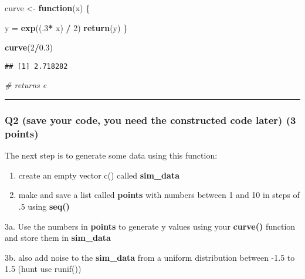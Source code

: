 \documentclass[]{article}
\newenvironment{Shaded}{\begin{snugshade}}{\end{snugshade}}
\newcommand{\KeywordTok}[1]{\textcolor[rgb]{0.13,0.29,0.53}{\textbf{#1}}}
\newcommand{\DecValTok}[1]{\textcolor[rgb]{0.00,0.00,0.81}{#1}}
\newcommand{\FloatTok}[1]{\textcolor[rgb]{0.00,0.00,0.81}{#1}}
\newcommand{\StringTok}[1]{\textcolor[rgb]{0.31,0.60,0.02}{#1}}
\newcommand{\CommentTok}[1]{\textcolor[rgb]{0.56,0.35,0.01}{\textit{#1}}}
\newcommand{\ControlFlowTok}[1]{\textcolor[rgb]{0.13,0.29,0.53}{\textbf{#1}}}
\newcommand{\OperatorTok}[1]{\textcolor[rgb]{0.81,0.36,0.00}{\textbf{#1}}}
\newcommand{\NormalTok}[1]{#1}
\begin{document}
\begin{Shaded}
\begin{Highlighting}[]
\NormalTok{curve <-}\StringTok{ }\ControlFlowTok{function}\NormalTok{(x) \{}
  
\NormalTok{  y =}\StringTok{ }\KeywordTok{exp}\NormalTok{((.}\DecValTok{3}\OperatorTok{*}\StringTok{ }\NormalTok{x) }\OperatorTok{/}\StringTok{ }\DecValTok{2}\NormalTok{)}
  \KeywordTok{return}\NormalTok{(y)}
\NormalTok{\}}

\KeywordTok{curve}\NormalTok{(}\DecValTok{2}\OperatorTok{/}\FloatTok{0.3}\NormalTok{)}
\end{Highlighting}
\end{Shaded}

\begin{verbatim}
## [1] 2.718282
\end{verbatim}

\begin{Shaded}
\begin{Highlighting}[]
\CommentTok{# returns e}
\end{Highlighting}
\end{Shaded}

\begin{center}\rule{0.5\linewidth}{\linethickness}\end{center}

\subsubsection{Q2 (save your code, you need the constructed code later)
(3
points)}\label{q2-save-your-code-you-need-the-constructed-code-later-3-points}

The next step is to generate some data using this function:

\begin{enumerate}
\def\labelenumi{\arabic{enumi}.}
\item
  create an empty vector c() called \textbf{sim\_data}
\item
  make and save a list called \textbf{points} with numbers between 1 and
  10 in steps of .5 using \textbf{seq()}
\end{enumerate}

3a. Use the numbers in \textbf{points} to generate y values using your
\textbf{curve()} function and store them in \textbf{sim\_data}

3b. also add noise to the \textbf{sim\_data} from a uniform distribution
between -1.5 to 1.5 (hunt use runif())
\end{document}
